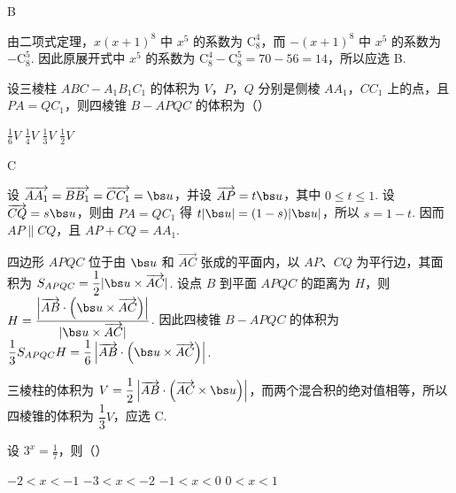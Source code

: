 \begin{answer}
B
\end{answer}

\begin{solution}
由二项式定理，\(x(x+1)^8\) 中 \(x^5\) 的系数为 \(\mathrm C_8^4\)，而 \(-(x+1)^8\) 中 \(x^5\) 的系数为 \(-\mathrm C_8^5\). 因此原展开式中 \(x^5\) 的系数为 \(\mathrm C_8^4-\mathrm C_8^5=70-56=14\)，所以应选 B.
\end{solution}



\begin{problem}
设三棱柱 \(ABC - A_{1}B_{1}C_{1}\) 的体积为 \(V\)，\(P\)，\(Q\) 分别是侧棱 \(AA_{1}\)，\(CC_{1}\) 上的点，且 \(PA = QC_{1}\)，则四棱锥 \(B - APQC\) 的体积为（\quad）

\choices
    {\(\frac{1}{6} V\)}
    {\(\frac{1}{4} V\)}
    {\(\frac{1}{3} V\)}
    {\(\frac{1}{2} V\)}
\end{problem}

\begin{answer}
C
\end{answer}

\begin{solution}
设 \(\overrightarrow{AA_1}=\overrightarrow{BB_1}=\overrightarrow{CC_1}=\bs u\)，并设 \(\overrightarrow{AP}=t\bs u\)，其中 \(0\leqslant t\leqslant1\). 设 \(\overrightarrow{CQ}=s\bs u\)，则由 \(PA=QC_1\) 得 \(t\lvert\bs u\rvert=(1-s)\lvert\bs u\rvert\)，所以 \(s=1-t\). 因而 \(AP\parallel CQ\)，且 \(AP+CQ=AA_1\).

四边形 \(APQC\) 位于由 \(\bs u\) 和 \(\overrightarrow{AC}\) 张成的平面内，以 \(AP\)、\(CQ\) 为平行边，其面积为
\(S_{APQC}=\dfrac12\lvert\bs u\times\overrightarrow{AC}\rvert\). 设点 \(B\) 到平面 \(APQC\) 的距离为 \(H\)，则
\(H=\dfrac{\left\lvert\overrightarrow{AB}\cdot\left(\bs u\times\overrightarrow{AC}\right)\right\rvert}{\lvert\bs u\times\overrightarrow{AC}\rvert}\). 因此四棱锥 \(B-APQC\) 的体积为
\(\dfrac13S_{APQC}H=\dfrac16\left\lvert\overrightarrow{AB}\cdot\left(\bs u\times\overrightarrow{AC}\right)\right\rvert\).

三棱柱的体积为 \(V=\dfrac12\left\lvert\overrightarrow{AB}\cdot\left(\overrightarrow{AC}\times\bs u\right)\right\rvert\)，而两个混合积的绝对值相等，所以四棱锥的体积为 \(\dfrac13V\)，应选 C.
\end{solution}



\begin{problem}
设 \(3^{x} = \frac{1}{7}\)，则（\quad）

\choices
    {\(-2 < x < -1\)}
    {\(-3 < x < -2\)}
    {\(-1 < x < 0\)}
    {\(0 < x < 1\)}
\end{problem}

